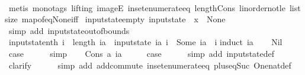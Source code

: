 \begin{isabellebody}
\ \ \ \ \isamarkupfalse%
\ {\isacharparenleft}metis\ {\isacharparenleft}mono{\isacharunderscore}tags{\isacharcomma}\ lifting{\isacharparenright}\ imageE\ in{\isacharunderscore}set{\isacharunderscore}enumerate{\isacharunderscore}eq\ length{\isacharunderscore}Cons\ linorder{\isacharunderscore}not{\isacharunderscore}le\ list{\isachardot}size{\isacharparenleft}{}{\isacharparenright}\ map{\isacharunderscore}of{\isacharunderscore}eq{\isacharunderscore}None{\isacharunderscore}iff{\isacharparenright}\isanewline
{}\isamarkupfalse%
%
\endisatagproof
{\isafoldproof}%
%
\isadelimproof
\isanewline
%
\endisadelimproof
\isanewline
{}\isamarkupfalse%
\ input{}state{\isacharunderscore}empty{\isacharcolon}\ {\isachardoublequoteopen}input{}state\ {\isacharbrackleft}{\isacharbrackright}\ x{}\ {\isacharequal}\ None{\isachardoublequoteclose}\isanewline
%
\isadelimproof
\ \ %
\endisadelimproof
%
\isatagproof
{}\isamarkupfalse%
\ {\isacharparenleft}simp\ add{\isacharcolon}\ input{}state{\isacharunderscore}out{\isacharunderscore}of{\isacharunderscore}bounds{\isacharparenright}%
\endisatagproof
{\isafoldproof}%
%
\isadelimproof
\isanewline
%
\endisadelimproof
\isanewline
{}\isamarkupfalse%
\ input{}state{\isacharunderscore}nth{\isacharcolon}\ {\isachardoublequoteopen}i\ {\isacharless}\ length\ ia\ {\isasymLongrightarrow}\ input{}state\ ia\ i\ {\isacharequal}\ Some\ {\isacharparenleft}ia\ {\isacharbang}\ i{\isacharparenright}{\isachardoublequoteclose}\isanewline
%
\isadelimproof
%
\endisadelimproof
%
\isatagproof
{}\isamarkupfalse%
{\isacharparenleft}induct\ ia{\isacharparenright}\isanewline
\ \ \isamarkupfalse%
\ Nil\isanewline
\ \ \isamarkupfalse%
\ \isamarkupfalse%
\ {\isacharquery}case\isanewline
\ \ \ \ \isamarkupfalse%
\ simp\isanewline
{}\isamarkupfalse%
\isanewline
\ \ \isamarkupfalse%
\ {\isacharparenleft}Cons\ a\ ia{\isacharparenright}\isanewline
\ \ \isamarkupfalse%
\ \isamarkupfalse%
\ {\isacharquery}case\isanewline
\ \ \ \ \isamarkupfalse%
\ {\isacharparenleft}simp\ add{\isacharcolon}\ input{}state{\isacharunderscore}def{\isacharparenright}\isanewline
\ \ \ \ \isamarkupfalse%
\ clarify\isanewline
\ \ \ \ \isamarkupfalse%
\ {\isacharparenleft}simp\ add{\isacharcolon}\ add{\isachardot}commute\ in{\isacharunderscore}set{\isacharunderscore}enumerate{\isacharunderscore}eq\ plus{\isacharunderscore}{}{\isacharunderscore}eq{\isacharunderscore}Suc\ One{\isacharunderscore}nat{\isacharunderscore}def{\isacharparenright}\isanewline

\end{isabellebody}

